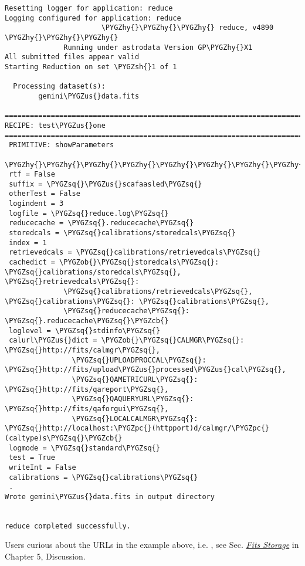 \documentclass[letterpaper,10pt,english]{sphinxmanual}
\def\PYGZus{\char`\_}
\def\PYGZob{\char`\{}
\def\PYGZcb{\char`\}}
\def\PYGZsh{\char`\#}
\def\PYGZpc{\char`\%}
\def\PYGZhy{\char`\-}
\def\PYGZsq{\char`\'}
\begin{document}
\begin{Verbatim}[commandchars=\\\{\}]
Resetting logger for application: reduce
Logging configured for application: reduce
                       \PYGZhy{}\PYGZhy{}\PYGZhy{} reduce, v4890  \PYGZhy{}\PYGZhy{}\PYGZhy{}
              Running under astrodata Version GP\PYGZhy{}X1
All submitted files appear valid
Starting Reduction on set \PYGZsh{}1 of 1

  Processing dataset(s):
        gemini\PYGZus{}data.fits

==============================================================================
RECIPE: test\PYGZus{}one
==============================================================================
 PRIMITIVE: showParameters
 \PYGZhy{}\PYGZhy{}\PYGZhy{}\PYGZhy{}\PYGZhy{}\PYGZhy{}\PYGZhy{}\PYGZhy{}\PYGZhy{}\PYGZhy{}\PYGZhy{}\PYGZhy{}\PYGZhy{}\PYGZhy{}\PYGZhy{}\PYGZhy{}\PYGZhy{}\PYGZhy{}\PYGZhy{}\PYGZhy{}\PYGZhy{}\PYGZhy{}\PYGZhy{}\PYGZhy{}\PYGZhy{}
 rtf = False
 suffix = \PYGZsq{}\PYGZus{}scafaasled\PYGZsq{}
 otherTest = False
 logindent = 3
 logfile = \PYGZsq{}reduce.log\PYGZsq{}
 reducecache = \PYGZsq{}.reducecache\PYGZsq{}
 storedcals = \PYGZsq{}calibrations/storedcals\PYGZsq{}
 index = 1
 retrievedcals = \PYGZsq{}calibrations/retrievedcals\PYGZsq{}
 cachedict = \PYGZob{}\PYGZsq{}storedcals\PYGZsq{}: \PYGZsq{}calibrations/storedcals\PYGZsq{}, \PYGZsq{}retrievedcals\PYGZsq{}:
              \PYGZsq{}calibrations/retrievedcals\PYGZsq{}, \PYGZsq{}calibrations\PYGZsq{}: \PYGZsq{}calibrations\PYGZsq{},
              \PYGZsq{}reducecache\PYGZsq{}: \PYGZsq{}.reducecache\PYGZsq{}\PYGZcb{}
 loglevel = \PYGZsq{}stdinfo\PYGZsq{}
 calurl\PYGZus{}dict = \PYGZob{}\PYGZsq{}CALMGR\PYGZsq{}: \PYGZsq{}http://fits/calmgr\PYGZsq{},
                \PYGZsq{}UPLOADPROCCAL\PYGZsq{}: \PYGZsq{}http://fits/upload\PYGZus{}processed\PYGZus{}cal\PYGZsq{},
                \PYGZsq{}QAMETRICURL\PYGZsq{}: \PYGZsq{}http://fits/qareport\PYGZsq{},
                \PYGZsq{}QAQUERYURL\PYGZsq{}: \PYGZsq{}http://fits/qaforgui\PYGZsq{},
                \PYGZsq{}LOCALCALMGR\PYGZsq{}: \PYGZsq{}http://localhost:\PYGZpc{}(httpport)d/calmgr/\PYGZpc{}(caltype)s\PYGZsq{}\PYGZcb{}
 logmode = \PYGZsq{}standard\PYGZsq{}
 test = True
 writeInt = False
 calibrations = \PYGZsq{}calibrations\PYGZsq{}
 .
Wrote gemini\PYGZus{}data.fits in output directory


reduce completed successfully.
\end{Verbatim}

Users curious about the URLs in the example above, i.e. , see
Sec. {\hyperref[discuss:fitsstore]{\emph{Fits Storage}}} in Chapter 5, Discussion.
\end{document}
